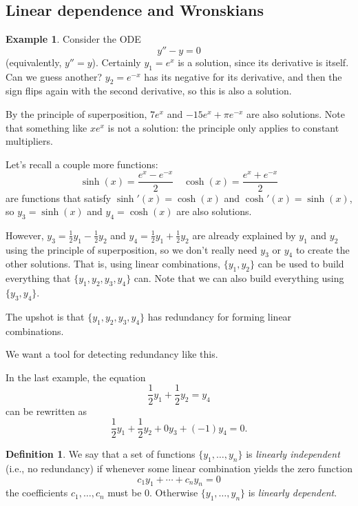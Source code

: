 \documentclass[12pt]{amsart}
\numberwithin{equation}{section}
\theoremstyle{plain} %
\theoremstyle{definition}
\newtheorem{defn}[equation]{Definition}
\newtheorem{ex}[equation]{Example}
\theoremstyle{remark}
\begin{document}

\subsection*{Linear dependence and Wronskians}

\begin{ex} Consider the ODE
\[ y'' - y=0\]
(equivalently, $y'' = y$).
Certainly $y_1= e^x$ is a solution, since its derivative is itself.
Can we guess another? $y_2= e^{-x}$ has its negative for its derivative, and then the sign flips again with the second derivative, so this is also a solution.

By the principle of superposition, $7 e^x$ and $-15 e^x + \pi e^{-x}$ are also solutions. Note that something like $x e^x$ is not a solution: the principle only applies to constant multipliers.

Let's recall a couple more functions:
\[ \sinh(x) = \frac{e^x - e^{-x}}{2} \quad \cosh(x) = \frac{e^x + e^{-x}}{2}\]
are functions that satisfy $\sinh'(x) = \cosh(x)$ and $\cosh'(x) = \sinh(x)$,
so $y_3=\sinh(x)$ and $y_4=\cosh(x)$ are also solutions.

However, $y_3 = \frac12 y_1 - \frac12 y_2$ and $y_4 = \frac 12 y_1 + \frac12 y_2$ are already explained by $y_1$ and $y_2$ using the principle of superposition, so we don't really need $y_3$ or $y_4$ to create the other solutions. That is, using linear combinations, $\{y_1,y_2\}$ can be used to build everything that $\{y_1,y_2,y_3,y_4\}$ can. Note that we can also build everything using $\{y_3,y_4\}$.

The upshot is that $\{y_1,y_2,y_3,y_4\}$ has redundancy for forming linear combinations.
\end{ex}

We want a tool for detecting redundancy like this.

In the last example, the equation
\[ \frac12 y_1 + \frac12 y_2 = y_4\]
can be rewritten as
\[ \frac12 y_1 + \frac12 y_2 + 0 y_3 + (-1) y_4   = 0.\]

\begin{defn} We say that a set of functions $\{y_1,\dots, y_n\}$ is \emph{linearly independent} (i.e., no redundancy) if whenever some linear combination yields the zero function
\[ c_1 y_1 + \cdots + c_n y_n = 0\]
the coefficients $c_1,\dots,c_n$ must be $0$. Otherwise $\{y_1,\dots, y_n\}$ is \emph{linearly dependent}.
\end{defn}
\end{document}
